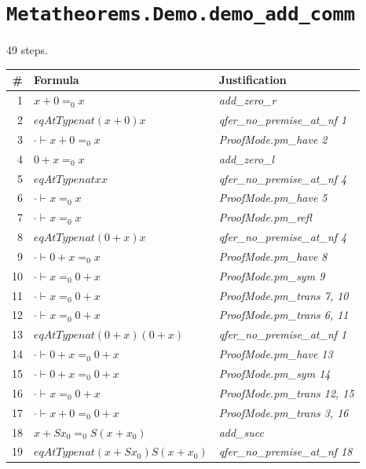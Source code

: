 \section*{\texttt{Metatheorems.Demo.demo\_add\_comm}}
49 steps.

\begin{longtable}{r l l}
\hline
\# & Formula & Justification \\
\hline
\endhead
1 & $x  +  0  =_0  x$ & \textit{add\_zero\_r} \\
2 & $eqAtType nat (x  +  0) x$ & \textit{qfer\_no\_premise\_at\_nf 1} \\
3 & $\cdot  \vdash  x  +  0  =_0  x$ & \textit{ProofMode.pm\_have 2} \\
4 & $0  +  x  =_0  x$ & \textit{add\_zero\_l} \\
5 & $eqAtType nat x x$ & \textit{qfer\_no\_premise\_at\_nf 4} \\
6 & $\cdot  \vdash  x  =_0  x$ & \textit{ProofMode.pm\_have 5} \\
7 & $\cdot  \vdash  x  =_0  x$ & \textit{ProofMode.pm\_refl} \\
8 & $eqAtType nat (0  +  x) x$ & \textit{qfer\_no\_premise\_at\_nf 4} \\
9 & $\cdot  \vdash  0  +  x  =_0  x$ & \textit{ProofMode.pm\_have 8} \\
10 & $\cdot  \vdash  x  =_0  0  +  x$ & \textit{ProofMode.pm\_sym 9} \\
11 & $\cdot  \vdash  x  =_0  0  +  x$ & \textit{ProofMode.pm\_trans 7, 10} \\
12 & $\cdot  \vdash  x  =_0  0  +  x$ & \textit{ProofMode.pm\_trans 6, 11} \\
13 & $eqAtType nat (0  +  x) (0  +  x)$ & \textit{qfer\_no\_premise\_at\_nf 1} \\
14 & $\cdot  \vdash  0  +  x  =_0  0  +  x$ & \textit{ProofMode.pm\_have 13} \\
15 & $\cdot  \vdash  0  +  x  =_0  0  +  x$ & \textit{ProofMode.pm\_sym 14} \\
16 & $\cdot  \vdash  x  =_0  0  +  x$ & \textit{ProofMode.pm\_trans 12, 15} \\
17 & $\cdot  \vdash  x  +  0  =_0  0  +  x$ & \textit{ProofMode.pm\_trans 3, 16} \\
18 & $x  +  S x_{0}  =_0  S (x  +  x_{0})$ & \textit{add\_succ} \\
19 & $eqAtType nat (x  +  S x_{0}) S (x  +  x_{0})$ & \textit{qfer\_no\_premise\_at\_nf 18} \\

\end{longtable}
